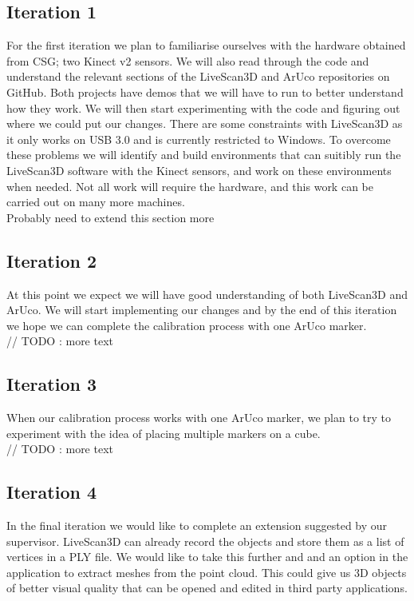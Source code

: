 \documentclass[a4paper,12pt]{article}
\begin{document}
\subsection*{Iteration 1}
For the first iteration we plan to familiarise ourselves with the hardware obtained from CSG; two Kinect v2 sensors. We will also read through the code and understand the relevant sections of the LiveScan3D and ArUco repositories on GitHub. Both projects have demos that we will have to run to better understand how they work. We will then start experimenting with the code and figuring out where we could put our changes.
There are some constraints with LiveScan3D as it only works on USB 3.0 and is currently restricted to Windows. To overcome these problems we will identify and build environments that can suitibly run the LiveScan3D software with the Kinect sensors, and work on these environments when needed. Not all work will require the hardware, and this work can be carried out on many more machines.
\\
Probably need to extend this section more

\subsection*{Iteration 2}
\iffalse
The calibration process in LiveScan3D is currently a bit cumbersome. The idea is to use ArUco to simplify this, and also possibly make it more accurate. Yes, you can use multiple markers, maybe even arranged on 3D objects like cubes. We can discuss details on Wednesday. A simplified calibration process would be important in the context of using something like LiveScan3D as a portable 3D recording tool.
\fi
At this point we expect we will have good understanding of both LiveScan3D and ArUco. We will start implementing our changes and by the end of this iteration we hope we can complete the calibration process with one ArUco marker.  \\
// TODO : more text

\subsection*{Iteration 3}
When our calibration process works with one ArUco marker, we plan to try to experiment with the idea of placing multiple markers on a cube. \\
// TODO : more text

\subsection*{Iteration 4}
In the final iteration we would like to complete an extension suggested by our supervisor. LiveScan3D can already record the objects and store them as a list of vertices in a PLY file. We would like to take this further and and an option in the application to extract meshes from the point cloud. This could give us 3D objects of better visual quality that can be opened and edited in third party applications. 
\end{document}
